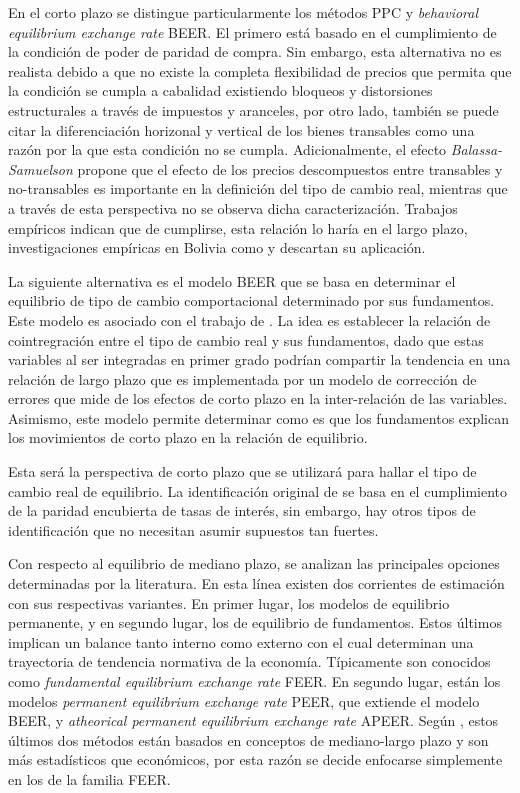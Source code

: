 \documentclass[12pt,letterpaper]{article}
\begin{document}
En el corto plazo se distingue particularmente los métodos PPC y \emph{behavioral equilibrium exchange rate} BEER. El primero está basado en el cumplimiento de la condición de poder de paridad de compra. Sin embargo, esta alternativa no es realista debido a que no existe la completa flexibilidad de precios que permita que la condición se cumpla a cabalidad existiendo bloqueos y distorsiones estructurales a través de impuestos y aranceles, por otro lado, también se puede citar la diferenciación horizonal y vertical de los bienes transables como una razón por la que esta condición no se cumpla. Adicionalmente, el efecto \emph{Balassa-Samuelson} propone que el efecto de los precios descompuestos entre transables y no-transables \citep{balassa1968effective} es importante en la definición del tipo de cambio real, mientras que a través de esta perspectiva no se observa dicha caracterización. Trabajos empíricos indican que de cumplirse, esta relación lo haría en el largo plazo, investigaciones empíricas en Bolivia como \cite{lora2000tipo} y \cite{humerez2005reexaminando} descartan su aplicación.

La siguiente alternativa es el modelo BEER que se basa en determinar el equilibrio de tipo de cambio comportacional determinado por sus fundamentos. Este modelo es asociado con el trabajo de \cite{clark1999exchange}. La idea es establecer la relación de cointregración entre el tipo de cambio real y sus fundamentos, dado que estas variables al ser integradas en primer grado podrían compartir la tendencia en una relación de largo plazo que es implementada por un modelo de corrección de errores que mide de los efectos de corto plazo en la inter-relación de las variables. Asimismo, este modelo permite determinar como es que los fundamentos explican los movimientos de corto plazo en la relación de equilibrio.

Esta será la perspectiva de corto plazo que se utilizará para hallar el tipo de cambio real de equilibrio. La identificación original de \cite{clark1999exchange} se basa en el cumplimiento de la paridad encubierta de tasas de interés, sin embargo, hay otros tipos de identificación que no necesitan asumir supuestos tan fuertes.

Con respecto al equilibrio de mediano plazo, se analizan las principales opciones determinadas por la literatura. En esta línea existen dos corrientes de estimación con sus respectivas variantes. En primer lugar, los modelos de equilibrio permanente, y en segundo lugar, los de equilibrio de fundamentos. Estos últimos implican un balance tanto interno como externo con el cual determinan una trayectoria de tendencia normativa de la economía. Típicamente son conocidos como \emph{fundamental equilibrium exchange rate} FEER. En segundo lugar, están los modelos \emph{permanent equilibrium exchange rate} PEER, que extiende el modelo BEER, y \emph{atheorical permanent equilibrium exchange rate} APEER. Según \cite{driver2005concepts}, estos últimos dos métodos están basados en conceptos de mediano-largo plazo y son más estadísticos que económicos, por esta razón se decide enfocarse simplemente en los de la familia FEER.
\end{document}

